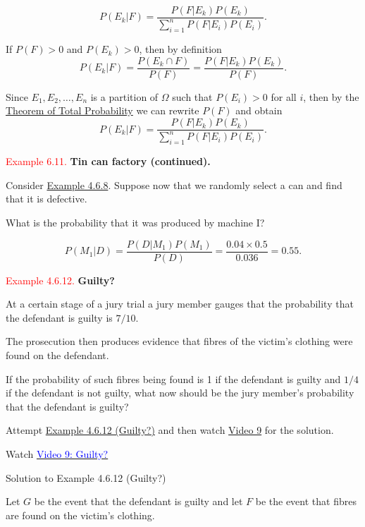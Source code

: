 \documentclass[
]{book}
\begin{document}
\[ P(E_k|F) = \frac{P(F|E_k) P(E_k)}{\sum_{i=1}^n P(F|E_i) P(E_i)}.\]

\hypertarget{prob:prf:bayes}{}
If \(P(F)>0\) and \(P(E_k)>0\), then by definition\\

\[P(E_k|F) = \frac{P(E_k \cap F)}{P(F)} = \frac{P(F|E_k) P(E_k)}{P(F)}.\]

Since \(E_1,E_2,\dots,E_n\) is a partition of \(\Omega\) such that \(P(E_i)>0\) for all \(i\), then by the \protect\hyperlink{prob:thm:totalprob}{Theorem of Total Probability} we can rewrite \(P(F)\) and obtain\\

\[P(E_k|F) = \frac{P(F|E_k) P(E_k)}{\sum_{i=1}^n P(F|E_i) P(E_i)}.\]

\leavevmode{}%
\textcolor{red}{Example 6.11.}
{\textbf{Tin can factory (continued).}}

Consider \protect\hyperlink{prob:ex:factory}{Example 4.6.8}. Suppose now that we randomly select a can and find that it is defective.

What is the probability that it was produced by machine I?

\[P(M_1|D)=\frac{P(D|M_1)P(M_1)}{P(D)}=\frac{0.04 \times 0.5}{0.036}=0.55.\]

\leavevmode{}%
\textcolor{red}{Example 4.6.12.}
{\textbf{Guilty?}}

At a certain stage of a jury trial a jury member gauges that the probability
that the defendant is guilty is \(7/10\).

The prosecution then produces evidence that fibres of the victim's clothing
were found on the defendant.

If the probability of such fibres being found is 1 if the defendant is guilty and
\(1/4\) if the defendant is not guilty, what now should be the jury member's
probability that the defendant is guilty?

Attempt \protect\hyperlink{prob:exer:guilty}{Example 4.6.12 (Guilty?)} and then watch \protect\hyperlink{video9}{Video 9} for the solution.

Watch \href{https://mediaspace.nottingham.ac.uk/media/GuiltyF+FINAL+VERSION/1_e1qr70ho}{\textcolor{blue}{Video 9: Guilty?}}

Solution to Example 4.6.12 (Guilty?)

Let \(G\) be the event that the defendant is guilty and let \(F\) be the event that fibres are found on the victim's clothing.
\end{document}
